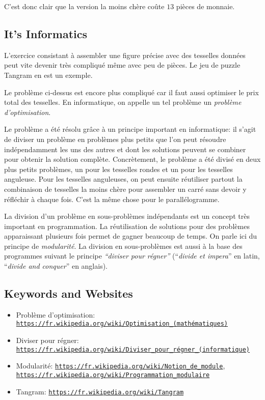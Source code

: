 \documentclass[a4paper,11pt]{report}
\newcommand{\BrochureUrlText}[1]{\texttt{#1}}
\begin{document}
C’est donc clair que la version la moins chère coûte $13$ pièces de monnaie.


\subsection*{It’s Informatics}

L’exercice consistant à assembler une figure précise avec des tesselles données peut vite devenir très compliqué même avec peu de pièces. Le jeu de puzzle Tangram en est un exemple.

Le problème ci-dessus est encore plus compliqué car il faut aussi optimiser le prix total des tesselles. En informatique, on appelle un tel problème un \emph{problème d’optimisation}.

Le problème a été résolu grâce à un principe important en informatique: il s’agit de diviser un problème en problèmes plus petits que l’on peut résoudre indépendamment les uns des autres et dont les solutions peuvent se combiner pour obtenir la solution complète. Concrètement, le problème a été divisé en deux plus petits problèmes, un pour les tesselles rondes et un pour les tesselles anguleuse. Pour les tesselles anguleuses, on peut ensuite réutiliser partout la combinaison de tesselles la moins chère pour assembler un carré sans devoir y réfléchir à chaque fois. C’est la même chose pour le parallélogramme.

La division d’un problème en sous-problèmes indépendants est un concept très important en programmation. La réutilisation de solutions pour des problèmes apparaissant plusieurs fois permet de gagner beaucoup de temps. On parle ici du principe de \emph{modularité}. La division en sous-problèmes est aussi à la base des programmes suivant le principe \emph{“diviser pour régner”} (“\emph{divide et impera}” en latin, “\emph{divide and conquer}” en anglais).

{\raggedright

\subsection*{Keywords and Websites}

\begin{itemize}
  \item Problème d’optimisation: \href{https://fr.wikipedia.org/wiki/Optimisation_(math\%C3\%A9matiques)}{\BrochureUrlText{https://fr.wikipedia.org/wiki/Optimisation\_(mathématiques)}}
  \item Diviser pour régner: \href{https://fr.wikipedia.org/wiki/Diviser_pour_r\%C3\%A9gner_(informatique)}{\BrochureUrlText{https://fr.wikipedia.org/wiki/Diviser\_pour\_régner\_(informatique)}}
  \item Modularité: \href{https://fr.wikipedia.org/wiki/Notion_de_module}{\BrochureUrlText{https://fr.wikipedia.org/wiki/Notion\_de\_module}}, \href{https://fr.wikipedia.org/wiki/Programmation_modulaire}{\BrochureUrlText{https://fr.wikipedia.org/wiki/Programmation\_modulaire}}
  \item Tangram: \href{https://fr.wikipedia.org/wiki/Tangram}{\BrochureUrlText{https://fr.wikipedia.org/wiki/Tangram}}
\end{itemize}


}
\end{document}
